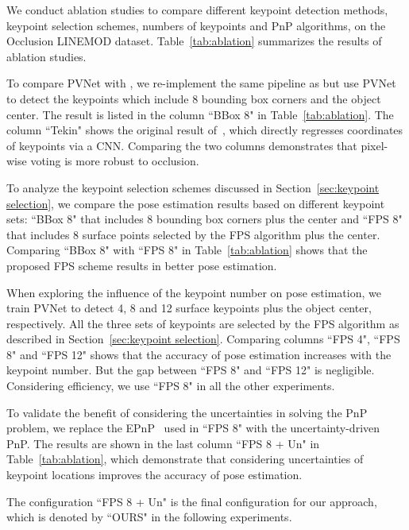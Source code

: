 \documentclass[10pt,twocolumn,letterpaper]{article}
\begin{document}
We conduct ablation studies to compare different keypoint detection methods, keypoint selection schemes, numbers of keypoints and PnP algorithms, on the Occlusion LINEMOD dataset. Table~\ref{tab:ablation} summarizes the results of ablation studies. 

To compare PVNet with \cite{tekin2018real}, we re-implement the same pipeline as \cite{tekin2018real} but use PVNet to detect the keypoints which include 8 bounding box corners and the object center. The result is listed in the column ``BBox 8" in Table~\ref{tab:ablation}. The column ``Tekin" shows the original result of~\cite{tekin2018real}, which directly regresses coordinates of keypoints via a CNN. Comparing the two columns demonstrates that pixel-wise voting is more robust to occlusion.

To analyze the keypoint selection schemes discussed in Section~\ref{sec:keypoint selection}, we compare the pose estimation results based on different keypoint sets: ``BBox 8" that includes 8 bounding box corners plus the center and  ``FPS 8" that includes 8 surface points selected by the FPS algorithm plus the center. Comparing ``BBox 8" with ``FPS 8" in Table~\ref{tab:ablation} shows that the proposed FPS scheme results in better pose estimation.

When exploring the influence of the keypoint number on pose estimation, we train PVNet to detect 4, 8 and 12 surface keypoints plus the object center, respectively. All the three sets of keypoints are selected by the FPS algorithm as described in Section~\ref{sec:keypoint selection}. Comparing columns ``FPS 4", ``FPS 8" and ``FPS 12" shows that the accuracy of pose estimation increases with the keypoint number. But the gap between ``FPS 8" and ``FPS 12" is negligible. Considering efficiency, we use ``FPS 8" in all the other experiments. 

To validate the benefit of considering the uncertainties in solving the PnP problem, we replace the EPnP~\cite{lepetit2009epnp} used in ``FPS 8" with the uncertainty-driven PnP. The results are shown in the last column ``FPS 8 + Un" in Table~\ref{tab:ablation}, which demonstrate that considering uncertainties of keypoint locations improves the accuracy of pose estimation.

The configuration ``FPS 8 + Un" is the final configuration for our approach, which is denoted by ``OURS" in the following experiments.
\end{document}
